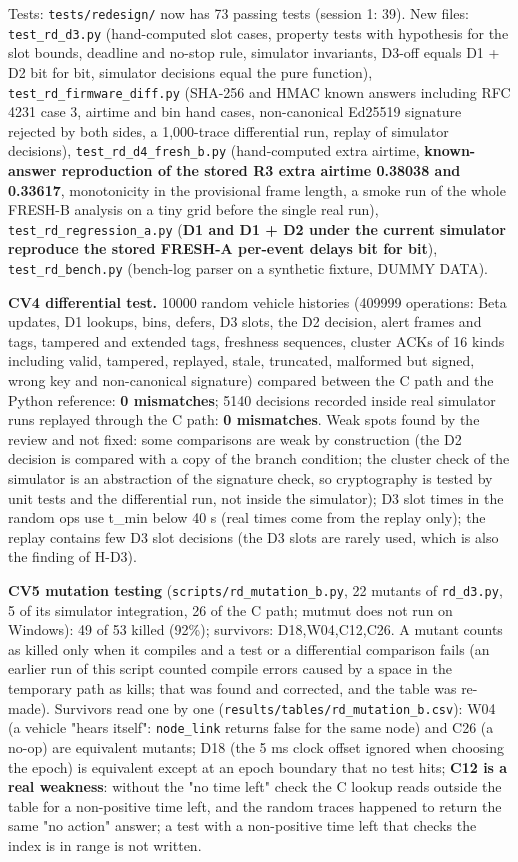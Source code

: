 Tests: \texttt{tests/redesign/} now has 73 passing tests (session 1: 39). New files: \texttt{test\_rd\_d3.py} (hand-computed slot cases, property tests with hypothesis for the slot bounds, deadline and no-stop rule, simulator invariants, D3-off equals D1 + D2 bit for bit, simulator decisions equal the pure function), \texttt{test\_rd\_firmware\_diff.py} (SHA-256 and HMAC known answers including RFC 4231 case 3, airtime and bin hand cases, non-canonical Ed25519 signature rejected by both sides, a 1,000-trace differential run, replay of simulator decisions), \texttt{test\_rd\_d4\_fresh\_b.py} (hand-computed extra airtime, \textbf{known-answer reproduction of the stored R3 extra airtime 0.38038 and 0.33617}, monotonicity in the provisional frame length, a smoke run of the whole FRESH-B analysis on a tiny grid before the single real run), \texttt{test\_rd\_regression\_a.py} (\textbf{D1 and D1 + D2 under the current simulator reproduce the stored FRESH-A per-event delays bit for bit}), \texttt{test\_rd\_bench.py} (bench-log parser on a synthetic fixture, DUMMY DATA).

\textbf{CV4 differential test.} 10000 random vehicle histories (409999 operations: Beta updates, D1 lookups, bins, defers, D3 slots, the D2 decision, alert frames and tags, tampered and extended tags, freshness sequences, cluster ACKs of 16 kinds including valid, tampered, replayed, stale, truncated, malformed but signed, wrong key and non-canonical signature) compared between the C path and the Python reference: \textbf{0 mismatches}; 5140 decisions recorded inside real simulator runs replayed through the C path: \textbf{0 mismatches}. Weak spots found by the review and not fixed: some comparisons are weak by construction (the D2 decision is compared with a copy of the branch condition; the cluster check of the simulator is an abstraction of the signature check, so cryptography is tested by unit tests and the differential run, not inside the simulator); D3 slot times in the random ops use t\_min below 40 s (real times come from the replay only); the replay contains few D3 slot decisions (the D3 slots are rarely used, which is also the finding of H-D3).

\textbf{CV5 mutation testing} (\texttt{scripts/rd\_mutation\_b.py}, 22 mutants of \texttt{rd\_d3.py}, 5 of its simulator integration, 26 of the C path; mutmut does not run on Windows): 49 of 53 killed (92\%); survivors: D18,W04,C12,C26. A mutant counts as killed only when it compiles and a test or a differential comparison fails (an earlier run of this script counted compile errors caused by a space in the temporary path as kills; that was found and corrected, and the table was re-made). Survivors read one by one (\texttt{results/tables/rd\_mutation\_b.csv}): W04 (a vehicle "hears itself": \texttt{node\_link} returns false for the same node) and C26 (a no-op) are equivalent mutants; D18 (the 5 ms clock offset ignored when choosing the epoch) is equivalent except at an epoch boundary that no test hits; \textbf{C12 is a real weakness}: without the "no time left" check the C lookup reads outside the table for a non-positive time left, and the random traces happened to return the same "no action" answer; a test with a non-positive time left that checks the index is in range is not written.

